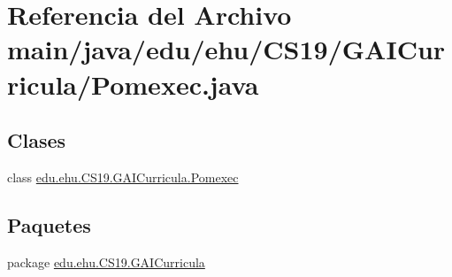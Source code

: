 \hypertarget{a00005}{}\section{Referencia del Archivo main/java/edu/ehu/\+C\+S19/\+G\+A\+I\+Curricula/\+Pomexec.java}
\label{a00005}
\subsection*{Clases}
\begin{DoxyCompactItemize}
\item 
class \mbox{\hyperlink{a00028}{edu.\+ehu.\+C\+S19.\+G\+A\+I\+Curricula.\+Pomexec}}
\end{DoxyCompactItemize}
\subsection*{Paquetes}
\begin{DoxyCompactItemize}
\item 
package \mbox{\hyperlink{a00017}{edu.\+ehu.\+C\+S19.\+G\+A\+I\+Curricula}}
\end{DoxyCompactItemize}
